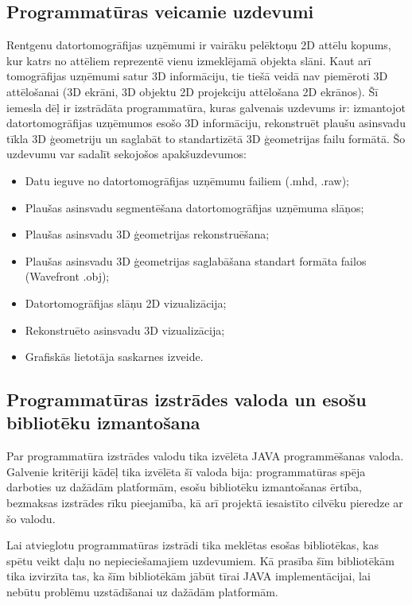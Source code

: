 \subsection{Programmatūras veicamie uzdevumi}

Rentgenu datortomogrāfijas uzņēmumi ir vairāku pelēktoņu 2D attēlu kopums, kur katrs no attēliem reprezentē vienu izmeklējamā objekta slāni. Kaut arī tomogrāfijas uzņēmumi satur 3D informāciju, tie tiešā veidā nav piemēroti 3D attēlošanai (3D ekrāni, 3D objektu 2D projekciju attēlošana 2D ekrānos). Šī iemesla dēļ ir izstrādāta programmatūra, kuras galvenais uzdevums ir: izmantojot datortomogrāfijas uzņēmumos esošo 3D informāciju, rekonstruēt plaušu asinsvadu tīkla 3D ģeometriju un saglabāt to  standartizētā 3D ģeometrijas failu formātā. 
Šo uzdevumu var sadalīt sekojošos apakšuzdevumos:
\begin{itemize}
\item{} Datu ieguve no datortomogrāfijas uzņēmumu failiem (.mhd, .raw);
\item{} Plaušas asinsvadu segmentēšana datortomogrāfijas uzņēmuma slāņos; 
\item{} Plaušas asinsvadu 3D ģeometrijas rekonstruēšana;
\item{} Plaušas asinsvadu 3D ģeometrijas saglabāšana standart formāta failos (Wavefront .obj);
\item{} Datortomogrāfijas slāņu 2D vizualizācija;
\item{} Rekonstruēto asinsvadu 3D vizualizācija;
\item{} Grafiskās lietotāja saskarnes izveide.
\end{itemize}

\subsection{Programmatūras izstrādes valoda un esošu bibliotēku izmantošana}

Par programmatūra izstrādes valodu tika izvēlēta JAVA programmēšanas valoda. Galvenie kritēriji kādēļ tika izvēlēta šī valoda bija: programmatūras spēja darboties uz dažādām platformām, esošu bibliotēku izmantošanas ērtība, bezmaksas izstrādes rīku pieejamība, kā arī projektā iesaistīto cilvēku pieredze ar šo valodu.

Lai atvieglotu programmatūras izstrādi tika meklētas esošas bibliotēkas, kas spētu veikt daļu no nepieciešamajiem uzdevumiem. Kā prasība šīm bibliotēkām tika izvirzīta tas, ka šīm bibliotēkām jābūt tīrai JAVA implementācijai, lai nebūtu problēmu uzstādīšanai uz dažādām platformām.

